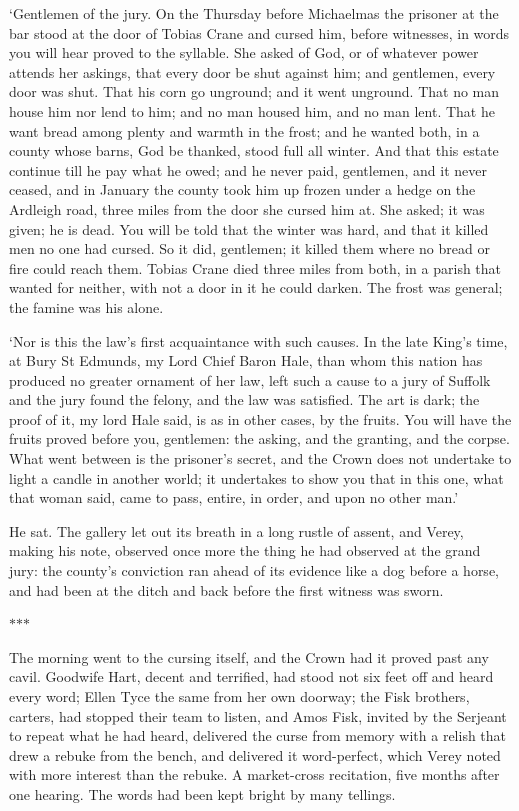 \documentclass[11pt]{article}
\newcommand{\scenebreak}{%
  \par\vspace{1.1\baselineskip}%
  {\centering $\ast$\quad$\ast$\quad$\ast$\par}%
  \vspace{1.1\baselineskip}\noindent}
\begin{document}
`Gentlemen of the jury. On the Thursday before Michaelmas the prisoner at the bar stood at the door of Tobias Crane and cursed him, before witnesses, in words you will hear proved to the syllable. She asked of God, or of whatever power attends her askings, that every door be shut against him; and gentlemen, every door was shut. That his corn go unground; and it went unground. That no man house him nor lend to him; and no man housed him, and no man lent. That he want bread among plenty and warmth in the frost; and he wanted both, in a county whose barns, God be thanked, stood full all winter. And that this estate continue till he pay what he owed; and he never paid, gentlemen, and it never ceased, and in January the county took him up frozen under a hedge on the Ardleigh road, three miles from the door she cursed him at. She asked; it was given; he is dead. You will be told that the winter was hard, and that it killed men no one had cursed. So it did, gentlemen; it killed them where no bread or fire could reach them. Tobias Crane died three miles from both, in a parish that wanted for neither, with not a door in it he could darken. The frost was general; the famine was his alone.

`Nor is this the law's first acquaintance with such causes. In the late King's time, at Bury St Edmunds, my Lord Chief Baron Hale, than whom this nation has produced no greater ornament of her law, left such a cause to a jury of Suffolk and the jury found the felony, and the law was satisfied. The art is dark; the proof of it, my lord Hale said, is as in other cases, by the fruits. You will have the fruits proved before you, gentlemen: the asking, and the granting, and the corpse. What went between is the prisoner's secret, and the Crown does not undertake to light a candle in another world; it undertakes to show you that in this one, what that woman said, came to pass, entire, in order, and upon no other man.'

He sat. The gallery let out its breath in a long rustle of assent, and Verey, making his note, observed once more the thing he had observed at the grand jury: the county's conviction ran ahead of its evidence like a dog before a horse, and had been at the ditch and back before the first witness was sworn.

\scenebreak
\noindent The morning went to the cursing itself, and the Crown had it proved past any cavil. Goodwife Hart, decent and terrified, had stood not six feet off and heard every word; Ellen Tyce the same from her own doorway; the Fisk brothers, carters, had stopped their team to listen, and Amos Fisk, invited by the Serjeant to repeat what he had heard, delivered the curse from memory with a relish that drew a rebuke from the bench, and delivered it word-perfect, which Verey noted with more interest than the rebuke. A market-cross recitation, five months after one hearing. The words had been kept bright by many tellings.
\end{document}
